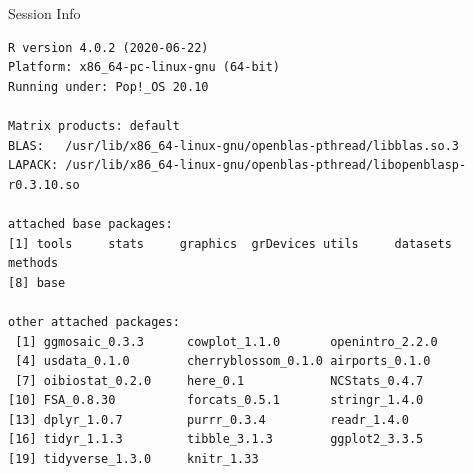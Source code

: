 \documentclass[10pt,handout]{beamer}\usepackage[]{graphicx}\usepackage[]{color}
\makeatletter
\newenvironment{kframe}{%
 \def\at@end@of@kframe{}%
 \ifinner\ifhmode%
  \def\at@end@of@kframe{\end{minipage}}%
  \begin{minipage}{\columnwidth}%
 \fi\fi%
 \def\FrameCommand##1{\hskip\@totalleftmargin \hskip-\fboxsep
 \colorbox{shadecolor}{##1}\hskip-\fboxsep
     \hskip-\linewidth \hskip-\@totalleftmargin \hskip\columnwidth}%
 \MakeFramed {\advance\hsize-\width
   \@totalleftmargin\z@ \linewidth\hsize
   \@setminipage}}%
 {\par\unskip\endMakeFramed%
 \at@end@of@kframe}
\newenvironment{knitrout}{}{} %
\makeatother
\begin{document}
\begin{frame}[fragile]{Session Info}
	\tiny
	
\begin{knitrout}\tiny
{}\color{fgcolor}\begin{kframe}
\begin{verbatim}
R version 4.0.2 (2020-06-22)
Platform: x86_64-pc-linux-gnu (64-bit)
Running under: Pop!_OS 20.10

Matrix products: default
BLAS:   /usr/lib/x86_64-linux-gnu/openblas-pthread/libblas.so.3
LAPACK: /usr/lib/x86_64-linux-gnu/openblas-pthread/libopenblasp-r0.3.10.so

attached base packages:
[1] tools     stats     graphics  grDevices utils     datasets  methods  
[8] base     

other attached packages:
 [1] ggmosaic_0.3.3      cowplot_1.1.0       openintro_2.2.0    
 [4] usdata_0.1.0        cherryblossom_0.1.0 airports_0.1.0     
 [7] oibiostat_0.2.0     here_0.1            NCStats_0.4.7      
[10] FSA_0.8.30          forcats_0.5.1       stringr_1.4.0      
[13] dplyr_1.0.7         purrr_0.3.4         readr_1.4.0        
[16] tidyr_1.1.3         tibble_3.1.3        ggplot2_3.3.5      
[19] tidyverse_1.3.0     knitr_1.33         


\end{verbatim}
\end{kframe}
\end{knitrout}
\end{frame}
\end{document}

